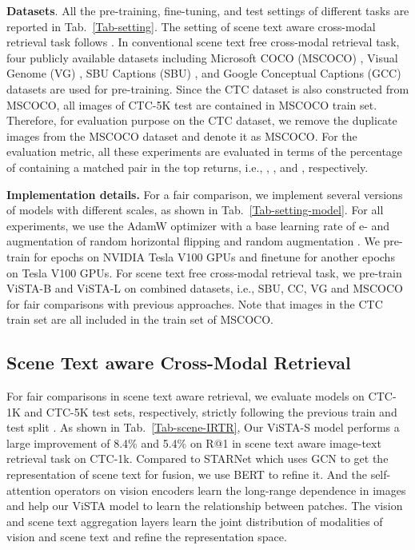 \documentclass[10pt,twocolumn,letterpaper]{article}
\begin{document}
\noindent\textbf{Datasets}. All the pre-training, fine-tuning, and test settings of different tasks are reported in Tab.~\ref{Tab-setting}. The setting of scene text aware cross-modal retrieval task follows \cite{STARNet}. In conventional scene text free cross-modal retrieval task, four publicly available datasets including Microsoft COCO (MSCOCO) \cite{MSCOCO_dataset}, Visual Genome (VG) \cite{VG_dataset}, SBU Captions (SBU) \cite{SBU_dataset}, and Google Conceptual Captions (GCC) \cite{GCC_dataset} datasets are used for pre-training. Since the CTC dataset is also constructed from MSCOCO, all images of CTC-5K test are contained in MSCOCO train set. Therefore, for evaluation purpose on the CTC dataset, we remove the duplicate images from the MSCOCO dataset and denote it as MSCOCO. For the evaluation metric, all these experiments are evaluated in terms of the percentage of containing a matched pair in the top returns, i.e., , , and , respectively. 

\noindent\textbf{Implementation details.} 
For a fair comparison, we implement several versions of models with different scales, as shown in Tab.~\ref{Tab-setting-model}. For all experiments, we use the AdamW optimizer with a base learning rate of e- and augmentation of random horizontal flipping and random augmentation \cite{Pixel-BERT}. We pre-train for  epochs on  NVIDIA Tesla V100 GPUs and finetune for another  epochs on  Tesla V100 GPUs. For scene text free cross-modal retrieval task, we pre-train ViSTA-B and ViSTA-L on combined datasets, i.e., SBU, CC, VG and MSCOCO for fair comparisons with previous approaches. Note that images in the CTC train set are all included in the train set of MSCOCO.




\subsection{Scene Text aware Cross-Modal Retrieval}
For fair comparisons in scene text aware retrieval, we evaluate models on CTC-1K and CTC-5K test sets, respectively, strictly following the previous train and test split \cite{STARNet}.
As shown in Tab.~\ref{Tab-scene-IRTR}, Our ViSTA-S model performs a large improvement of 8.4\% and 5.4\% on R@1 in scene text aware image-text retrieval task on CTC-1k. 
Compared to STARNet \cite{STARNet} which uses GCN to get the representation of scene text for fusion, we use BERT to refine it.
And the self-attention operators on vision encoders learn the long-range dependence in images and help our ViSTA model to learn the relationship between patches.
The vision and scene text aggregation layers learn the joint distribution of modalities of vision and scene text and refine the representation space.
\end{document}

